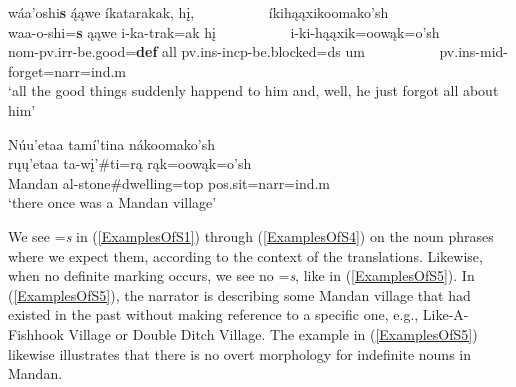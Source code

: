\begin{exe}
\begin{xlist}
\item\label{ExamplesOfS4} \glll wáa'oshi\textbf{s} ą́ąwe íkatarakak, hį, ~ ~ ~ ~ ~ ~   íkihąąxikoomako'sh\\
    waa-o-shi=\textbf{s} ąąwe i-ka-trak=ak hį ~ ~ ~ ~ ~ ~   i-ki-hąąxik=oowąk=o'sh\\
    nom-pv.irr-\textnormal{be.good}=\textbf{def} \textnormal{all} pv.ins-incp-\textnormal{be.blocked}=ds \textnormal{um} ~ ~ ~ ~ ~ ~  pv.ins-mid-\textnormal{forget}=narr=ind.m\\
    \glt `all the good things suddenly happend to him and, well, he just forgot all about him' \citep[251]{trechter2012}
    
\item\label{ExamplesOfS5} \glll Núu'etaa tamí'tina nákoomako'sh\\
    rųų'etaa ta-wį'\#ti=rą rąk=oowąk=o'sh\\
    \textnormal{Mandan} al-\textnormal{stone}\#\textnormal{dwelling}=top pos.sit=narr=ind.m\\
    \glt `there once was a Mandan village' \citet[125]{hollow1973a}


\end{xlist}

\end{exe}

We see =\textit{s} in (\ref{ExamplesOfS1}) through (\ref{ExamplesOfS4}) on the noun phrases where we expect them, according to the context of the translations. Likewise, when no definite marking occurs, we see no =\textit{s}, like in (\ref{ExamplesOfS5}). In (\ref{ExamplesOfS5}), the narrator is describing some Mandan village that had existed in the past without making reference to a specific one, e.g., Like-A-Fishhook Village or Double Ditch Village. The example in (\ref{ExamplesOfS5}) likewise illustrates that there is no overt morphology for indefinite nouns in Mandan.

